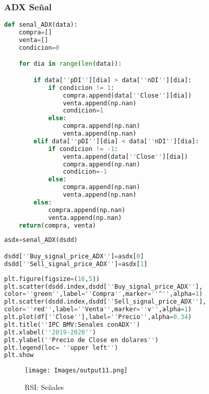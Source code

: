 \documentclass[letterpaper,12pt,oneside]{book}
\begin{document}
\subsubsection{ADX Señal}
\begin{lstlisting}[language=Python]
def senal_ADX(data):
    compra=[]
    venta=[]
    condicion=0

    for dia in range(len(data)):

        if data[''pDI''][dia] > data[''nDI''][dia]:
            if condicion != 1:
                compra.append(data[''Close''][dia])
                venta.append(np.nan)
                condicion=1
            else:
                compra.append(np.nan)
                venta.append(np.nan)
        elif data[''pDI''][dia] < data[''nDI''][dia]:
            if condicion != -1:
                venta.append(data[''Close''][dia])
                compra.append(np.nan)
                condicion=-1
            else:
                compra.append(np.nan)
                venta.append(np.nan)
        else:
            compra.append(np.nan)
            venta.append(np.nan)
    return(compra, venta)
\end{lstlisting}

\begin{lstlisting}[language=Python]
asdx=senal_ADX(dsdd)

dsdd[''Buy_signal_price_ADX'']=asdx[0]
dsdd[''Sell_signal_price_ADX'']=asdx[1]
\end{lstlisting}


\begin{lstlisting}[language=Python]
plt.figure(figsize=(16,5))
plt.scatter(dsdd.index,dsdd[''Buy_signal_price_ADX''],
color=''green'',label=''Compra'',marker=''^'',alpha=1)
plt.scatter(dsdd.index,dsdd[''Sell_signal_price_ADX''],
color=''red'',label=''Venta'',marker=''v'',alpha=1)
plt.plot(df[''Close''],label=''Precio'',alpha=0.34)
plt.title(''IPC BMV:Senales conADX'')
plt.xlabel(''2019-2020'')
plt.ylabel(''Precio de Close en dolares'')
plt.legend(loc= ''upper left'')
plt.show
\end{lstlisting}

\begin{figure}[ht]
	\centering
	\texttt{[image: Images/output11.png]}
	\caption{RSI: Señales}
	\label{fig:m12}
\end{figure}
\end{document}
